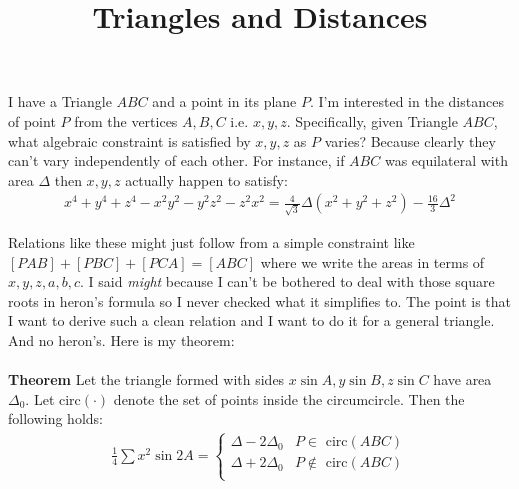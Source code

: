 \documentclass{article}
\author{\vspace{-5ex}}
\title{Triangles and Distances}
\date{\vspace{-5ex}}
\begin{document}
\maketitle

\begin{center}
\end{center}
I have a Triangle $ABC$ and a point in its plane $P$. I'm interested in the distances of point $P$ from the vertices $A,B,C$ i.e. $x,y,z$. Specifically, given Triangle $ABC$, what algebraic constraint is satisfied by $x,y,z$ as $P$ varies? Because clearly they can't vary independently of each other. For instance, if $ABC$ was equilateral with area $\Delta$ then $x,y,z$ actually happen to satisfy:
\begin{align}
    x^4+y^4+z^4 - x^2y^2-y^2z^2-z^2x^2 = \frac{4}{\sqrt{3}}\Delta\left(x^2+y^2+z^2 \right)- \frac{16}{3}\Delta^2
\end{align}

Relations like these might just follow from a simple constraint like $[PAB]+[PBC]+[PCA] = [ABC]$ where we write the areas in terms of $x,y,z,a,b,c$. I said \textit{might} because I can't be bothered to deal with those square roots in heron's formula so I never checked what it simplifies to. The point is that I want to derive such a clean relation and I want to do it for a general triangle. And no heron's. Here is my theorem:
\\\\
\textbf{Theorem} Let the triangle formed with sides $x\sin A, y\sin B, z\sin C$ have area $\Delta_0$. Let circ$(\cdot)$ denote the set of points inside the circumcircle. Then the following holds:
\begin{align}
    \frac{1}{4}\sum x^2\sin 2A  = \begin{cases}
        \Delta - 2\Delta_0 & \textrm{$P \in$ circ$(ABC)$} \\
        \Delta + 2\Delta_0 & \textrm{$P\notin$ circ$(ABC)$} \\
    \end{cases}
\end{align}
\end{document}
